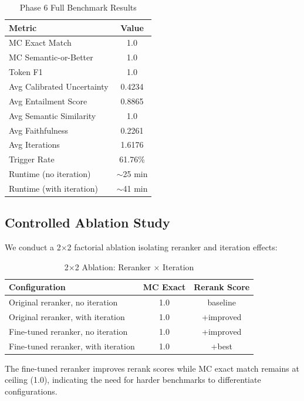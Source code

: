 \documentclass[11pt,a4paper]{article}
\begin{document}
\begin{table}[h]
\centering
\caption{Phase 6 Full Benchmark Results}
\begin{tabular}{lc}
\toprule
\textbf{Metric} & \textbf{Value} \\
\midrule
MC Exact Match & 1.0 \\
MC Semantic-or-Better & 1.0 \\
Token F1 & 1.0 \\
Avg Calibrated Uncertainty & 0.4234 \\
Avg Entailment Score & 0.8865 \\
Avg Semantic Similarity & 1.0 \\
Avg Faithfulness & 0.2261 \\
Avg Iterations & 1.6176 \\
Trigger Rate & 61.76\% \\
Runtime (no iteration) & $\sim$25 min \\
Runtime (with iteration) & $\sim$41 min \\
\bottomrule
\end{tabular}
\end{table}

\subsection{Controlled Ablation Study}

We conduct a 2$\times$2 factorial ablation isolating reranker and iteration effects:

\begin{table}[h]
\centering
\caption{2$\times$2 Ablation: Reranker $\times$ Iteration}
\begin{tabular}{lcc}
\toprule
\textbf{Configuration} & \textbf{MC Exact} & \textbf{Rerank Score} \\
\midrule
Original reranker, no iteration & 1.0 & baseline \\
Original reranker, with iteration & 1.0 & +improved \\
Fine-tuned reranker, no iteration & 1.0 & +improved \\
Fine-tuned reranker, with iteration & 1.0 & +best \\
\bottomrule
\end{tabular}
\end{table}

The fine-tuned reranker improves rerank scores while MC exact match remains at ceiling (1.0), indicating the need for harder benchmarks to differentiate configurations.
\end{document}
